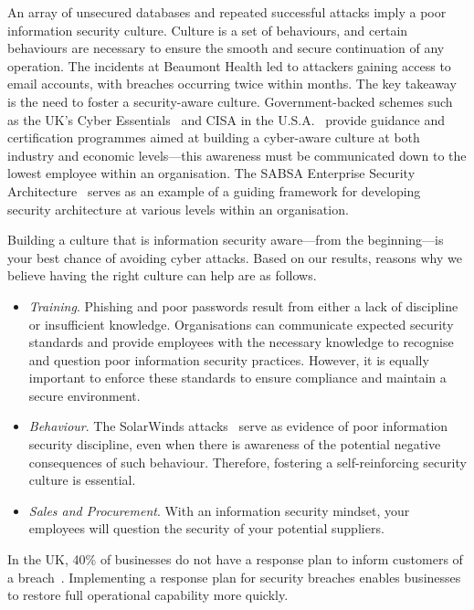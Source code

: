 An array of unsecured databases and repeated successful attacks imply a poor information security culture. Culture is a set of behaviours, and certain behaviours are necessary to ensure the smooth and secure continuation of any operation. The incidents at Beaumont Health led to attackers gaining access to email accounts, with breaches occurring twice within months. The key takeaway is the need to foster a security-aware culture. Government-backed schemes such as the UK's Cyber Essentials~\cite{uk_gov_cyber_2018} and CISA in the U.S.A.~\cite{cisa_cyber_2020} provide guidance and certification programmes aimed at building a cyber-aware culture at both industry and economic levels—this awareness must be communicated down to the lowest employee within an organisation. The SABSA Enterprise Security Architecture~\cite{noauthor_sabsa_2020} serves as an example of a guiding framework for developing security architecture at various levels within an organisation.

Building a culture that is information security aware---from the beginning---is your best chance of avoiding cyber attacks. Based on our results, reasons why we believe having the right culture can help are as follows.

\begin{itemize}
\item
  \emph{Training}. Phishing and poor passwords result from either a lack of discipline or insufficient knowledge. Organisations can communicate expected security standards and provide employees with the necessary knowledge to recognise and question poor information security practices. However, it is equally important to enforce these standards to ensure compliance and maintain a secure environment.
\item
  \emph{Behaviour}. The SolarWinds attacks~\cite{fireeye_highly_2020} serve as evidence of poor information security discipline, even when there is awareness of the potential negative consequences of such behaviour. Therefore, fostering a self-reinforcing security culture is essential.
\item
  \emph{Sales and Procurement}. With an information security mindset, your employees will question the security of your potential suppliers.
\end{itemize}

In the UK, 40\% of businesses do not have a response plan to inform customers of a breach~\cite{furdui_502_2019}. Implementing a response plan for security breaches enables businesses to restore full operational capability more quickly.

